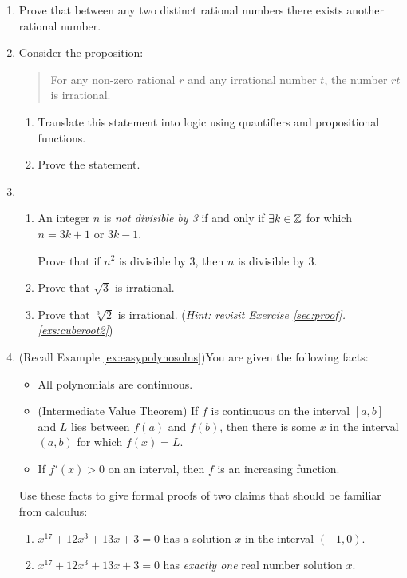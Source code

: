 \begin{exercises}{}{}
\begin{enumerate}
	  
		\item Prove that between any two distinct rational numbers there exists another rational number.\label{ex:rationalsdenseinthemselves}
		
	
		\item Consider the proposition:
	  \begin{quote}
	      For any non-zero rational $r$ and any irrational number $t$, the number $rt$ is irrational.
	  \end{quote}
	  \begin{enumerate}
	      \item Translate this statement into logic using quantifiers and propositional functions.
	      \item Prove the statement.
	  \end{enumerate}
	
		
		\item\begin{enumerate}
		  \item An integer $n$ is \emph{not divisible by 3} if and only if $\exists k\in\mathbb{Z}$ for which $n=3k+1$ or $3k-1$.\par
		  Prove that if $n^2$ is divisible by 3, then $n$ is divisible by 3.
		  \item Prove that $\sqrt 3$ is irrational.
		  \item Prove that $\sqrt[3]{2}$ is irrational. (\emph{Hint: revisit Exercise \ref*{sec:proof}.\ref{exs:cuberoot2}}) 
		\end{enumerate}
	

	  \item (Recall Example \ref{ex:easypolynosolns})\lstsp You are given the following facts:
	  \begin{itemize}
	    \item All polynomials are continuous.
	    \item (Intermediate Value Theorem) If $f$ is continuous on the interval $[a,b]$ and $L$ lies between $f(a)$ and $f(b)$, then there is some $x$ in the interval $(a,b)$ for which $f(x)=L$.
	    \item If $f'(x)>0$ on an interval, then $f$ is an increasing function.
		\end{itemize}
		Use these facts to give formal proofs of two claims that should be familiar from calculus:
		\begin{enumerate}
		  \item $x^{17}+12x^3+13x+3=0$ has a solution $x$ in the interval $(-1,0)$.
		  \item $x^{17}+12x^3+13x+3=0$ has \emph{exactly one} real number solution $x$.
		\end{enumerate}
	

\end{enumerate}
\end{exercises}
